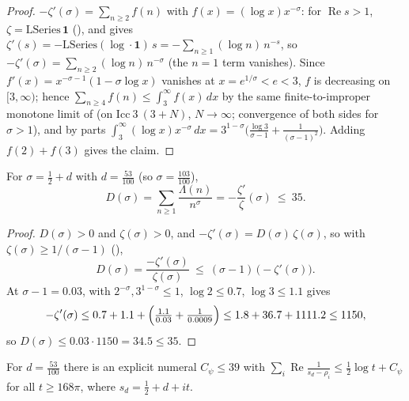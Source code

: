 \begin{proof}
\leanok
$-\zeta'(\sigma)=\sum_{n\ge2}f(n)$ with $f(x)=(\log x)x^{-\sigma}$: for
$\operatorname{Re}s>1$, $\zeta=\mathrm{LSeries}\,\mathbf 1$
(), and  gives
$\zeta'(s)=-\mathrm{LSeries}(\log\cdot\mathbf 1)\,s=-\sum_{n\ge1}(\log n)\,n^{-s}$, so
$-\zeta'(\sigma)=\sum_{n\ge2}(\log n)\,n^{-\sigma}$ (the $n=1$ term vanishes). Since
$f'(x)=x^{-\sigma-1}(1-\sigma\log x)$
vanishes at $x=e^{1/\sigma}<e<3$, $f$ is decreasing on $[3,\infty)$; hence
$\sum_{n\ge4}f(n)\le\int_3^\infty f(x)\,dx$ by the same finite-to-improper monotone limit
of  (on $\mathrm{Icc}\ 3\ (3+N)$, $N\to\infty$;
convergence of both sides for $\sigma>1$), and by parts
$\int_3^\infty(\log x)x^{-\sigma}\,dx=3^{1-\sigma}\bigl(\tfrac{\log3}{\sigma-1}+\tfrac1{(\sigma-1)^2}\bigr)$.
Adding $f(2)+f(3)$ gives the claim.
\end{proof}

\begin{lemma}
\label{lem:le_dirichlet_bound}
\leanok
{}
For $\sigma=\tfrac12+d$ with $d=\tfrac{53}{100}$ (so $\sigma=\tfrac{103}{100}$),
\[
  D(\sigma)=\sum_{n\ge1}\frac{\Lambda(n)}{n^{\sigma}}=-\frac{\zeta'}{\zeta}(\sigma)\ \le\ 35 .
\]
\end{lemma}

\begin{proof}
\leanok
$D(\sigma)>0$ and $\zeta(\sigma)>0$, and $-\zeta'(\sigma)=D(\sigma)\,\zeta(\sigma)$, so with
$\zeta(\sigma)\ge1/(\sigma-1)$ (),
\[
  D(\sigma)=\frac{-\zeta'(\sigma)}{\zeta(\sigma)}\ \le\ (\sigma-1)\,\bigl(-\zeta'(\sigma)\bigr).
\]
At $\sigma-1=0.03$,  with $2^{-\sigma},3^{1-\sigma}\le1$,
$\log2\le0.7$, $\log3\le1.1$ gives
\[
  -\zeta'(\sigma)\le0.7+1.1+\Bigl(\tfrac{1.1}{0.03}+\tfrac1{0.0009}\Bigr)
  \le 1.8+36.7+1111.2\le 1150,
\]
so $D(\sigma)\le0.03\cdot1150=34.5\le 35$.
\end{proof}

\begin{lemma}
\label{lem:le_zeta_sum_explicit}
\leanok
{}
For $d=\tfrac{53}{100}$ there is an explicit numeral $C_\psi\le 39$ with
$\displaystyle\sum_i\operatorname{Re}\frac1{s_d-\rho_i}\le\tfrac12\log t+C_\psi$ for all
$t\ge168\pi$, where $s_d=\tfrac12+d+it$.
\end{lemma}

